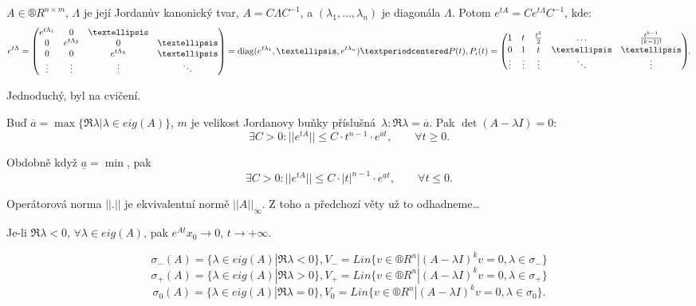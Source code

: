 \documentclass[12pt]{article}					%
\begin{document}

\begin{veta}
	$A \in ®R^{n \times m}$, $\Lambda$ je její Jordanův kanonický tvar, $A = C \Lambda C^{-1}$, a $(\lambda_1, …, \lambda_n)$ je diagonála $\Lambda$. Potom $e^{t A} = C e^{t \Lambda} C^{-1}$, kde:
	$$ e^{t \Lambda} = \begin{pmatrix} e^{t \Lambda_1} & 0 & … \\ 0 & e^{t \Lambda_2} & 0 & … \\ 0 & 0 & e^{t \Lambda_3} & … \\ \vdots & \vdots & \vdots & \ddots \end{pmatrix} = \diag(e^{t \lambda_1}, …, e^{t \lambda_n}) · P(t), P_i(t) = \begin{pmatrix} 1 & t & \frac{t^2}{2} & \ldots & \frac{t^{k-1}}{(k-1)!} \\ 0 & 1 & t & … & … \\ \vdots & \vdots & \vdots & \ddots & \vdots \end{pmatrix}\hspace{-0.3em}. $$

	\begin{dukazin}
		Jednoduchý, byl na cvičení.
	\end{dukazin}
\end{veta}

\begin{dusledek}
	Buď $\overline a = \max \{\Re \lambda | \lambda \in eig(A)\}$, $m$ je velikost Jordanovy buňky příslušná $\lambda: \Re \lambda = \overline a$. Pak $\det(A - \lambda I) = 0$:
	$$ \exists C > 0: ||e^{t A}|| ≤ C · t^{n-1}·e^{\overline a t}, \qquad \forall t ≥ 0. $$

	Obdobně když $\underline a = \min$, pak
	$$ \exists C > 0: ||e^{t A}|| ≤ C · |t|^{n-1}·e^{\underline a t}, \qquad \forall t ≤ 0. $$

	\begin{dukazin}
		Operátorová norma $||.||$ je ekvivalentní normě $||A||_∞$. Z toho a předchozí věty už to odhadneme…
	\end{dukazin}
\end{dusledek}

\begin{dusledek}
	Je-li $\Re \lambda < 0$, $\forall \lambda \in eig(A)$, pak $e^{A t} x_0 \rightarrow 0$, $t \rightarrow +∞$.
\end{dusledek}

\begin{definice}
	$$ \sigma_-(A) = \{\lambda \in eig(A) | \Re \lambda < 0\}, V_- = Lin\{v \in ®R^n | (A - \lambda I)^k v = 0, \lambda \in \sigma_-\} $$
	$$ \sigma_+(A) = \{\lambda \in eig(A) | \Re \lambda > 0\}, V_+ = Lin\{v \in ®R^n | (A - \lambda I)^k v = 0, \lambda \in \sigma_+\} $$
	$$ \sigma_0(A) = \{\lambda \in eig(A) | \Re \lambda = 0\}, V_0 = Lin\{v \in ®R^n | (A - \lambda I)^k v = 0, \lambda \in \sigma_0\}. $$
\end{definice}
\end{document}
